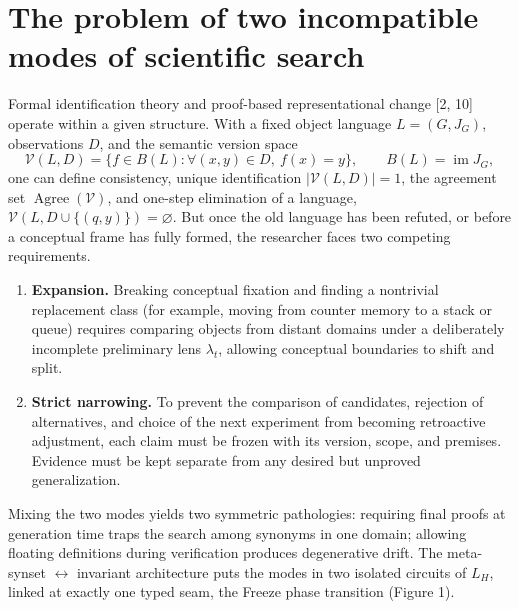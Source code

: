 \documentclass[11pt,a4paper]{article}
\begin{document}
\section{The problem of two incompatible modes of scientific search}

Formal identification theory and proof-based representational change [2, 10] operate within a given structure. With a fixed object language \(L=(G,J_G)\), observations \(D\), and the semantic version space
\[
\mathcal V(L,D)=\{f\in B(L):\forall (x,y)\in D,\ f(x)=y\},\qquad B(L)=\operatorname{im}J_G, \tag{1}
\]
one can define consistency, unique identification \(|\mathcal V(L,D)|=1\), the agreement set \(\operatorname{Agree}(\mathcal V)\), and one-step elimination of a language, \(\mathcal V(L,D\cup\{(q,y)\})=\varnothing\). But once the old language has been refuted, or before a conceptual frame has fully formed, the researcher faces two competing requirements.

\begin{enumerate}
\item \textbf{Expansion.} Breaking conceptual fixation and finding a nontrivial replacement class (for example, moving from counter memory to a stack or queue) requires comparing objects from distant domains under a deliberately incomplete preliminary lens \(\lambda_t\), allowing conceptual boundaries to shift and split.
\item \textbf{Strict narrowing.} To prevent the comparison of candidates, rejection of alternatives, and choice of the next experiment from becoming retroactive adjustment, each claim must be frozen with its version, scope, and premises. Evidence must be kept separate from any desired but unproved generalization.

\end{enumerate}
Mixing the two modes yields two symmetric pathologies: requiring final proofs at generation time traps the search among synonyms in one domain; allowing floating definitions during verification produces degenerative drift. The meta-synset \(\leftrightarrow\) invariant architecture puts the modes in two isolated circuits of \(L_H\), linked at exactly one typed seam, the Freeze phase transition (Figure 1).
\end{document}
